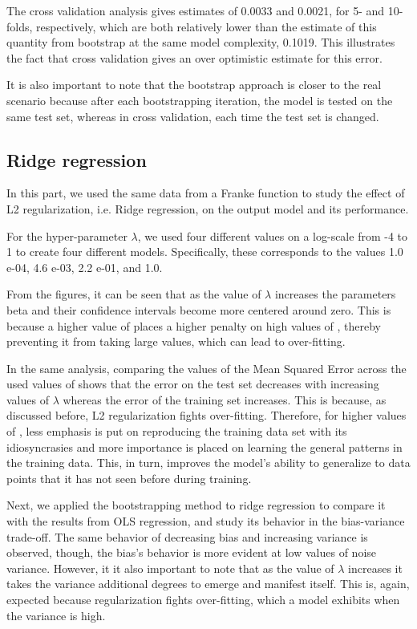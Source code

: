 \documentclass{article}
\begin{document}
The cross validation analysis gives estimates of 0.0033 and 0.0021, for 5- and 10-folds, respectively, which are both relatively lower than the estimate of this quantity from bootstrap at the same model complexity, 0.1019. This illustrates the fact that cross validation gives an over optimistic estimate for this error.

It is also important to note that the bootstrap approach is closer to the real scenario because after each bootstrapping iteration, the model is tested on the same test set, whereas in cross validation, each time the test set is changed.


\subsection{Ridge regression}
In this part, we used the same data from a Franke function to study the effect of L2 regularization, i.e. Ridge regression, on the output model and its performance.

For the hyper-parameter $\lambda$, we used four different values on a log-scale from -4 to 1 to create four different models. Specifically, these corresponds to the values 1.0 e-04, 4.6 e-03, 2.2 e-01, and 1.0.

From the figures, it can be seen that as the value of $\lambda$ increases the parameters beta and their confidence intervals become more centered around zero. This is because a higher value of  places a higher penalty on high values of , thereby preventing it from taking large values, which can lead to over-fitting.

In the same analysis, comparing the values of the Mean Squared Error across the used values of  shows that the error on the test set decreases with increasing values of $\lambda$ whereas the error of the training set increases. This is because, as discussed before, L2 regularization fights over-fitting. Therefore, for higher values of , less emphasis is put on reproducing the training data set with its idiosyncrasies and more importance is placed on learning the general patterns in the training data. This, in turn, improves the model’s ability to generalize to data points that it has not seen before during training.

Next, we applied the bootstrapping method to ridge regression to compare it with the results from OLS regression, and study its behavior in the bias-variance trade-off. The same behavior of decreasing bias and increasing variance is observed, though, the bias’s behavior is more evident at low values of noise variance. However, it it also important to note that as the value of $\lambda$ increases it takes the variance additional degrees to emerge and manifest itself. This is, again, expected because regularization fights over-fitting, which a model exhibits when the variance is high.
\end{document}

